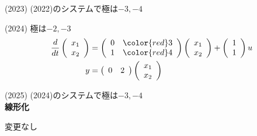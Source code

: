 (2023) (2022)のシステムで極は{\color{red}$-3, -4$}

(2024) 極は{\color{red}$-2, -3$}
\begin{align*}
	\frac{d}{dt}
	\left (
	\begin{array}{c}
	 x_1 \\ x_2 
	\end{array}
	\right )
	& = 
	\left (
	\begin{array}{cc}
	 0 & {\color{red}3} \\
	 1 & {\color{red}4}
	\end{array}
	\right )
	\left (
	\begin{array}{c}
	 x_1 \\ x_2 
	\end{array}
	\right )
	+
	\left (
	\begin{array}{c}
	 1 \\ 1 
	\end{array}
	\right )
	u
\\
	y&=
	\left ( \begin{array}{cc}
		0 & 2 
	\end{array} \right )
	\left (	\begin{array}{c}
		x_1 \\ x_2 
	\end{array} \right )
\end{align*}

(2025) (2024)のシステムで極は{\color{red}$-3, -4$}
\ \\ \noindent
{\bf 線形化}

変更なし




